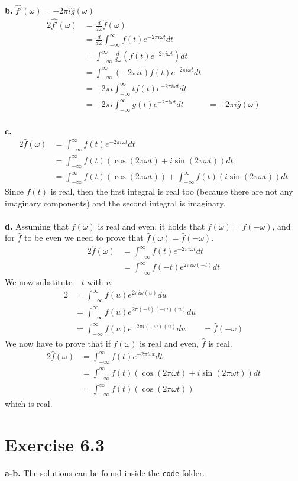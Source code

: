 \documentclass[12pt]{article}
\begin{document}
	\textbf{b.} $\hat{f'}(\omega) = - 2 \pi i \hat{g}(\omega)$
	\begin{alignat*}{2}
		\hat{f'}(\omega) &= \frac{d}{d\omega} \hat{f}(\omega)\\
		&= \frac{d}{d\omega} \int_{-\infty}^{\infty} f(t) e^{-2\pi i \omega t} dt\\
		&= \int_{-\infty}^{\infty} \frac{d}{d\omega} (f(t)e^{-2\pi i \omega t})  dt\\
		&= \int_{-\infty}^{\infty} (-2\pi i t) f(t)e^{-2\pi i \omega t}  dt\\
		&= -2\pi i \int_{-\infty}^{\infty} t f(t)e^{-2\pi i \omega t}  dt\\
		&= -2\pi i \int_{-\infty}^{\infty} g(t) e^{-2\pi i \omega t}  dt &= -2\pi i \hat{g}(\omega)
	\end{alignat*}\\
	\textbf{c.}
	\begin{alignat*}{2}
	\hat{f}(\omega) &= \int_{-\infty}^{\infty} f(t) e^{-2\pi i \omega t} dt\\
	&= \int_{-\infty}^{\infty} f(t)(\cos(2\pi\omega t) + i \sin(2\pi\omega t)) dt\\
	&= \int_{-\infty}^{\infty} f(t)(\cos(2\pi\omega t) ) + \int_{-\infty}^{\infty} f(t)(i \sin(2\pi\omega t)) dt
	\end{alignat*}
	Since $f(t)$ is real, then the first integral is real too (because there are not any imaginary components) and the second integral is imaginary.\\\\
	\textbf{d.} Assuming that $f(\omega)$ is real and even, it holds that $f(\omega) = f(-\omega)$, and for $\hat{f}$ to be even we need to prove that $\hat{f}(\omega) = \hat{f}(-\omega)$.
	\begin{alignat*}{2}
	\hat{f}(\omega) &= \int_{-\infty}^{\infty} f(t) e^{-2\pi i \omega t} dt\\
	&= \int_{-\infty}^{\infty} f(-t) e^{2\pi i \omega (-t)} dt
	\end{alignat*}
	We now substitute $-t$ with $u$:
	\begin{alignat*}{2}
	&= \int_{-\infty}^{\infty} f(u) e^{2\pi i \omega (u)} du\\
	&= \int_{-\infty}^{\infty} f(u) e^{2\pi (-i) (-\omega) (u)} du\\
	&= \int_{-\infty}^{\infty} f(u) e^{-2\pi i (-\omega) (u)} du &= \hat{f}(-\omega)
	\end{alignat*}
	We now have to prove that if $f(\omega)$ is real and even, $\hat{f}$ is real.
	\begin{alignat*}{2}
	\hat{f}(\omega) &= \int_{-\infty}^{\infty} f(t) e^{-2\pi i \omega t} dt\\
	&= \int_{-\infty}^{\infty} f(t)(\cos(2\pi\omega t) + i \sin(2\pi\omega t)) dt\\
	&= \int_{-\infty}^{\infty} f(t)(\cos(2\pi\omega t) )
	\end{alignat*}
	which is real.
	\section*{Exercise 6.3}
	\textbf{a-b.} The solutions can be found inside the \texttt{code} folder.
\end{document}
